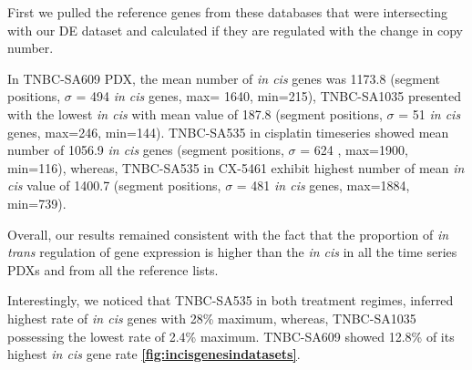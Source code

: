 First we pulled the reference genes from these databases that were intersecting with our \ac{DE} dataset and calculated if they are regulated with the change in copy number.

 In TNBC-SA609 PDX, the mean number of \textit{in cis} genes was 1173.8 (segment positions, $\sigma$ = 494 \textit{in cis} genes, max= 1640, min=215), TNBC-SA1035 presented with the lowest \textit{in cis} with
 mean value of 187.8 (segment positions, $\sigma$ = 51 \textit{in cis} genes, max=246, min=144). TNBC-SA535 in cisplatin timeseries showed mean number of 1056.9 \textit{in cis} genes (segment positions, $\sigma$ = 624 , max=1900, min=116), whereas, TNBC-SA535 in CX-5461 exhibit highest number of mean \textit{in cis} value of 1400.7 (segment positions, $\sigma$ = 481 \textit{in cis} genes, max=1884, min=739).
 
 Overall, our results remained consistent with the fact that the proportion of \textit{in trans} regulation of gene expression is higher than the \textit{in cis} in all the time series PDXs and from all the reference lists.   
 
 Interestingly, we noticed that TNBC-SA535 in both treatment regimes, inferred highest rate of \textit{in cis} genes with 28\% maximum, whereas, TNBC-SA1035 possessing the lowest rate of 2.4\% maximum. TNBC-SA609  showed 12.8\% of its highest \textit{in cis} gene rate \textbf{\autoref{fig:incisgenesindatasets}}.



